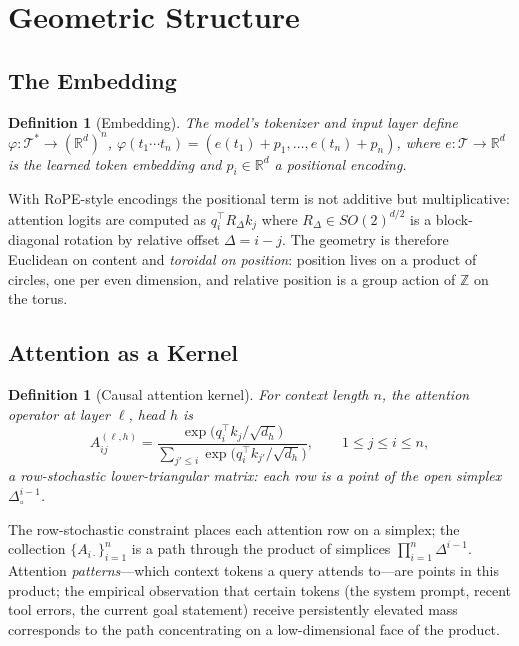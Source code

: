 \documentclass[11pt]{article}
\newtheorem{definition}[theorem]{Definition}
\begin{document}
\section{Geometric Structure}\label{sec:geometry}

\subsection{The Embedding}

\begin{definition}[Embedding]
The model's tokenizer and input layer define
$\varphi : \mathcal{T}^* \to (\mathbb{R}^d)^n$,
$\varphi(t_1 \cdots t_n) = (e(t_1) + p_1, \dots, e(t_n) + p_n)$,
where $e : \mathcal{T} \to \mathbb{R}^d$ is the learned token embedding and
$p_i \in \mathbb{R}^d$ a positional encoding.
\end{definition}

With RoPE-style encodings the positional term is not additive but
multiplicative: attention logits are computed as
$q_i^\top R_{\Delta} k_j$ where $R_\Delta \in SO(2)^{d/2}$ is a block-diagonal
rotation by relative offset $\Delta = i - j$. The geometry is therefore
Euclidean on content and \emph{toroidal on position}: position lives on a
product of circles, one per even dimension, and relative position is a group
action of $\mathbb{Z}$ on the torus.

\subsection{Attention as a Kernel}

\begin{definition}[Causal attention kernel]
For context length $n$, the attention operator at layer $\ell$, head $h$ is
\[
A^{(\ell,h)}_{ij} = \frac{\exp\!\big(q_i^\top k_j / \sqrt{d_h}\big)}
{\sum_{j' \le i} \exp\!\big(q_i^\top k_{j'} / \sqrt{d_h}\big)},
\qquad 1 \le j \le i \le n,
\]
a row-stochastic lower-triangular matrix: each row is a point of the open
simplex $\Delta^{i-1}_{\circ}$.
\end{definition}

The row-stochastic constraint places each attention row on a simplex; the
collection $\{A_{i\cdot}\}_{i=1}^n$ is a path through the product of
simplices $\prod_{i=1}^n \Delta^{i-1}$. Attention \emph{patterns}---which
context tokens a query attends to---are points in this product; the
empirical observation that certain tokens (the system prompt, recent tool
errors, the current goal statement) receive persistently elevated mass
corresponds to the path concentrating on a low-dimensional face of the
product.
\end{document}
